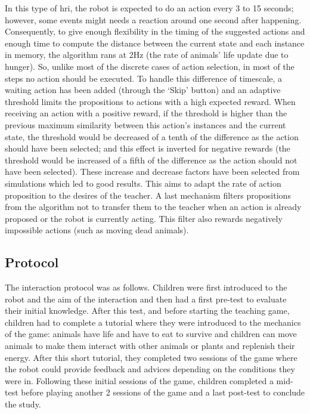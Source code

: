 In this type of \gls{hri}, the robot is expected to do an action every 3 to 15 seconds; however, some events might needs a reaction around one second after happening. Consequently, to give enough flexibility in the timing of the suggested actions and enough time to compute the distance between the current state and each instance in memory, the algorithm rans at 2Hz (the rate of animals' life update due to hunger). So, unlike most of the discrete cases of action selection, in most of the steps no action should be executed. To handle this difference of timescale, a waiting action has been added (through the `Skip' button) and an adaptive threshold limits the propositions to actions with a high expected reward. When receiving an action with a positive reward, if the threshold is higher than the previous maximum similarity between this action's instances and the current state, the threshold would be decreased of a tenth of the difference as the action should have been selected; and this effect is inverted for negative rewards (the threshold would be increased of a fifth of the difference as the action should not have been selected). These increase and decrease factors have been selected from simulations which led to good results. This aims to adapt the rate of action proposition to the desires of the teacher. A last mechanism filters propositions from the algorithm not to transfer them to the teacher when an action is already proposed or the robot is currently acting. This filter also rewards negatively impossible actions (such as moving dead animals).

\subsection{Protocol}

The interaction protocol was as follows. Children were first introduced to the robot and the aim of the interaction and then had a first pre-test to evaluate their initial knowledge. After this test, and before starting the teaching game, children had to complete a tutorial where they were introduced to the mechanics of the game: animals have life and have to eat to survive and children can move animals to make them interact with other animals or plants and replenish their energy. After this short tutorial, they completed two sessions of the game where the robot could provide feedback and advices depending on the conditions they were in. Following these initial sessions of the game, children completed a mid-test before playing another 2 sessions of the game and a last post-test to conclude the study. 

